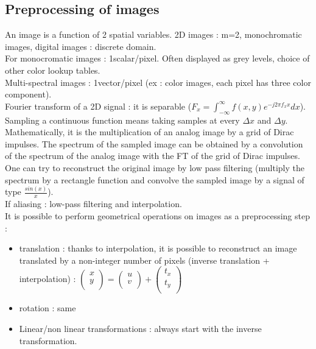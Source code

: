 \documentclass[../main.tex]{subfiles}
\begin{document}
\localtableofcontents
\subsection{Preprocessing of images}
An image is a function of 2 spatial variables. 2D images : m=2, monochromatic images, digital images : discrete domain. \\
For monocromatic images : 1scalar/pixel. Often displayed as grey levels, choice of other color lookup tables. \\
Multi-spectral images : 1vector/pixel (ex : color images, each pixel has three color component).\\

Fourier transform of a 2D signal : it is separable ($F_x = \int_{-\infty}^\infty f(x,y) e^{-j2\pi f_x x}dx$).\\
Sampling a continuous function means taking samples at every $\Delta x$ and $\Delta y$. Mathematically, it is the multiplication of an analog image by a grid of Dirac impulses. The spectrum of the sampled image can be obtained by a convolution of the spectrum of the analog image with the FT of the grid of Dirac impulses. One can try to reconstruct the original image by low pass filtering (multiply the spectrum by a rectangle function and convolve the sampled image by a signal of type $\frac{sin(x)}{x}$).\\
If aliasing : low-pass filtering and interpolation. \\
It is possible to perform geometrical operations on images as a preprocessing step : \begin{itemize}
    \item translation : thanks to interpolation, it is possible to reconstruct an image translated by a non-integer number of pixels (inverse translation + interpolation) : $\begin{pmatrix}
        x\\y\\
    \end{pmatrix} = \begin{pmatrix}
        u\\v\\
    \end{pmatrix} + \begin{pmatrix}
        t_x\\t_y\\
    \end{pmatrix}$
    \item rotation : same 
    \item Linear/non linear transformations : always start with the inverse transformation. 
\end{itemize}
\end{document}
